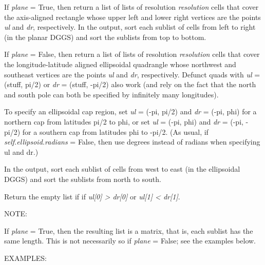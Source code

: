 \documentclass[a4paper,12ptopenany,oneside]{sphinxmanual}
\begin{document}
\begin{fulllineitems}
\begin{fulllineitems}
\end{fulllineitems}


\begin{fulllineitems}
\label{dggs_rhealpix:dggs_rhealpix.RHEALPixDGGS.cells_from_region}
If \emph{plane} = True, then return a list of lists of resolution 
\emph{resolution} cells that cover the axis-aligned rectangle whose 
upper left and lower right vertices are the points \emph{ul} and \emph{dr}, 
respectively.  
In the output, sort each sublist of cells from left to right (in the 
planar DGGS) and sort the sublists from top to bottom.

If \emph{plane} = False, then return a list of lists of resolution 
\emph{resolution} 
cells that cover the longitude-latitude aligned ellipsoidal quadrangle  
whose northwest and southeast vertices are the points \emph{ul} and \emph{dr}, 
respectively. Defunct quads with \emph{ul} = (stuff, pi/2) or 
\emph{dr} = (stuff, -pi/2) also work 
(and rely on the fact that the north and south pole can both 
be specified by infinitely many longitudes).

To specify an ellipsoidal cap region, set \emph{ul} = (-pi, pi/2) and 
\emph{dr} = (-pi, phi) for a northern cap from latitudes pi/2 to phi, or 
set \emph{ul} = (-pi, phi) and \emph{dr} = (-pi, -pi/2) for a southern cap from 
latitudes phi to -pi/2. (As usual, if \emph{self.ellipsoid.radians} = False, 
then use degrees instead of radians when specifying ul and dr.)

In the output, sort each sublist of cells from west to east (in the 
ellipsoidal DGGS) and sort the sublists from north to south.

Return the empty list if if \emph{ul{[}0{]} \textgreater{} dr{[}0{]}} or \emph{ul{[}1{]} \textless{} dr{[}1{]}}.

NOTE:

If \emph{plane} = True, then the resulting list is a matrix, that is,
each sublist has the same length.  This is not necessarily so if
\emph{plane} = False; see the examples below.

EXAMPLES:


\end{fulllineitems}
\end{fulllineitems}
\end{document}
